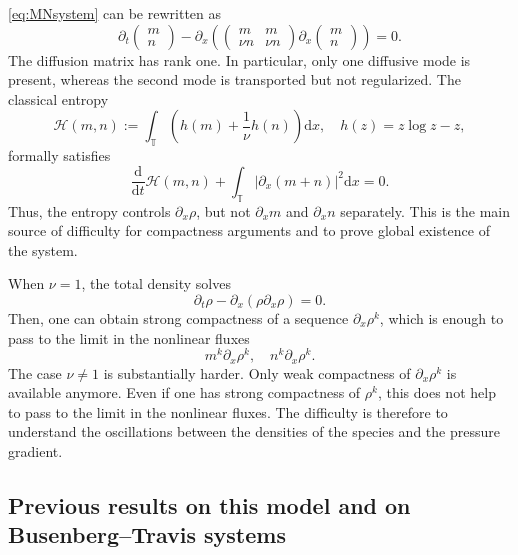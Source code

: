 \documentclass[a4paper,twosided,11pt]{article}
\newcommand{\1}{\mathbf{1}}
\theoremstyle{plain}
\theoremstyle{remark}
\numberwithin{equation}{section}
\begin{document}
\eqref{eq:MNsystem} can be rewritten as
$$
\partial_t \begin{pmatrix}
m\\ n
\end{pmatrix}
- \partial_x \left(
\begin{pmatrix} m&m\\
\nu n&\nu n
\end{pmatrix} \partial_x
\begin{pmatrix}
m\\ n
\end{pmatrix}
\right)=0.
$$
The diffusion matrix has rank one. In particular, only one diffusive mode is present, whereas the second mode is transported but not regularized. The classical entropy
$$
\mathcal H(m,n):=
\int_{\mathbb T}\left(h(m)+\frac1\nu h(n)\right) \mathrm dx,
\quad
h(z)=z\log z-z,
$$
formally satisfies
$$
\frac{\mathrm d}{\mathrm dt}\mathcal H(m,n)
+\int_{\mathbb T}|\partial_x(m+n)|^2 \mathrm dx=0.
$$
Thus, the entropy controls $\partial_x\rho$, but not $\partial_xm$ and $\partial_xn$ separately. This is the main source of difficulty for compactness arguments and to prove global existence of the system.

When $\nu=1$, the total density solves
$$
\partial_t\rho-\partial_x(\rho \partial_x\rho)=0.
$$
Then, one can obtain strong compactness of a sequence $\partial_x\rho^k$, which is enough to pass to the limit in the nonlinear fluxes
$$
m^k \partial_x\rho^k,
\quad
n^k \partial_x\rho^k.
$$
The case $\nu\neq1$ is substantially harder. Only weak compactness of $\partial_x\rho^k$ is available anymore. Even if one has strong compactness of $\rho^k$, this does not help to pass to the limit in the nonlinear fluxes. The difficulty is therefore to understand the oscillations between the densities of the species and the pressure gradient.

\subsection{Previous results on this model and on Busenberg--Travis systems}
\end{document}
